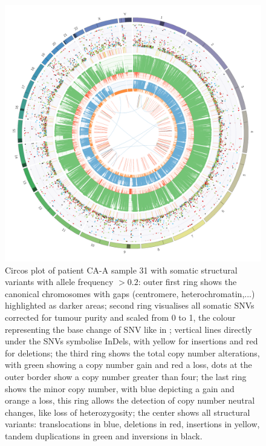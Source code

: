 \begin{figure}[!ht]
\centering
\includegraphics[width=.99\linewidth]{Figures/CASCADE/CA99/CA99-31.circos.png}
\caption[Circos plot of patient CA-A sample 31]{Circos plot of patient CA-A sample 31 with somatic structural variants with allele frequency $> 0.2$: outer first ring shows the canonical chromosomes with gaps (centromere, heterochromatin,...) highlighted as darker areas; second ring visualises all somatic SNVs corrected for tumour purity and scaled from 0 to 1, the colour representing the base change of SNV like in \protect\textcite{Alexandrov2013}; vertical lines directly under the SNVs symbolise InDels, with yellow for insertions and red for deletions; the third ring shows the total copy number alterations, with green showing a copy number gain and red a loss, dots at the outer border show a copy number greater than four; the last ring shows the minor copy number, with blue depicting a gain and orange a loss, this ring allows the detection of copy number neutral changes, like loss of heterozygosity; the center shows all structural variants: translocations in blue, deletions in red, insertions in yellow, tandem duplications in green and inversions in black.} \label{fig:ca99.31circos}
\end{figure}


